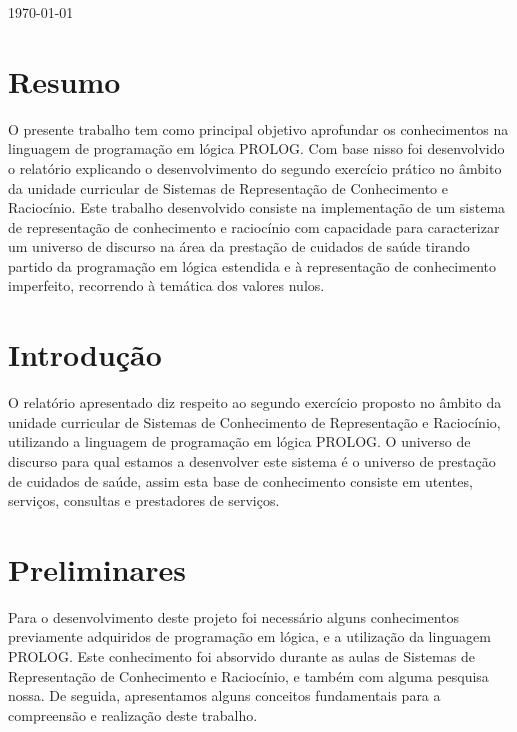 \documentclass[25pt]{article}
\begin{document}
\begin{titlepage}
{\large \today}\\[2cm]




\vfill %

\end{titlepage}



\newpage
\tableofcontents

\newpage
\section{Resumo}
 O presente trabalho tem como principal objetivo aprofundar os conhecimentos na linguagem de programação em lógica PROLOG.\newline
 Com base nisso foi desenvolvido o relatório explicando o desenvolvimento do segundo exercício prático no âmbito da unidade
 curricular de Sistemas de Representação de Conhecimento e Raciocínio.\newline
 Este trabalho desenvolvido consiste na implementação de um sistema de representação de conhecimento e raciocínio com capacidade
 para caracterizar um universo de discurso na área da prestação de cuidados de saúde tirando partido da programação em lógica estendida
e à representação de conhecimento imperfeito, recorrendo à temática dos valores nulos.\newline


\newpage
\section{Introdução}
O relatório apresentado diz respeito ao segundo exercício proposto no âmbito da unidade curricular de Sistemas de
Conhecimento de Representação e Raciocínio, utilizando a linguagem de programação em lógica PROLOG. O universo de discurso
para qual estamos a desenvolver este sistema é o universo de prestação de cuidados de saúde, assim esta base de conhecimento consiste
em utentes, serviços, consultas e prestadores de serviços.
\newpage

\section{Preliminares}
Para o desenvolvimento deste projeto foi necessário alguns conhecimentos previamente adquiridos de programação em lógica, e a
utilização da linguagem PROLOG. Este conhecimento foi absorvido durante as aulas de Sistemas de Representação de Conhecimento e Raciocínio,
e também com alguma pesquisa nossa. De seguida, apresentamos alguns conceitos fundamentais para a compreensão e realização deste trabalho.
\end{document}
